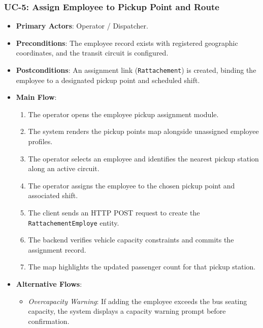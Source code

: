 \subsubsection{UC-5: Assign Employee to Pickup Point and Route}
\begin{itemize}
  \item \textbf{Primary Actors}: Operator / Dispatcher.
  \item \textbf{Preconditions}: The employee record exists with registered geographic coordinates, and the transit circuit is configured.
  \item \textbf{Postconditions}: An assignment link (\texttt{Rattachement}) is created, binding the employee to a designated pickup point and scheduled shift.
  \item \textbf{Main Flow}:
  \begin{enumerate}
    \item The operator opens the employee pickup assignment module.
    \item The system renders the pickup points map alongside unassigned employee profiles.
    \item The operator selects an employee and identifies the nearest pickup station along an active circuit.
    \item The operator assigns the employee to the chosen pickup point and associated shift.
    \item The client sends an HTTP POST request to create the \texttt{RattachementEmploye} entity.
    \item The backend verifies vehicle capacity constraints and commits the assignment record.
    \item The map highlights the updated passenger count for that pickup station.
  \end{enumerate}
  \item \textbf{Alternative Flows}:
  \begin{itemize}
    \item \emph{Overcapacity Warning}: If adding the employee exceeds the bus seating capacity, the system displays a capacity warning prompt before confirmation.
  \end{itemize}
\end{itemize}

